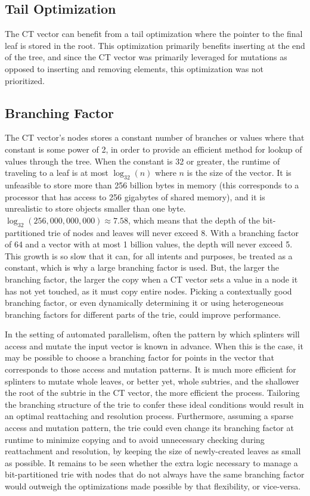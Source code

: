 \subsection{Tail Optimization}
The CT vector can benefit from a tail optimization where the pointer to
the final leaf is stored in the root. This optimization primarily benefits
inserting at the end of the tree, and since the CT vector was primarily
leveraged for mutations as opposed to inserting and removing elements, this
optimization was not prioritized.

\subsection{Branching Factor}
The CT vector's nodes stores a constant number of branches or values where that
constant is some power of 2, in order to provide an efficient method for lookup
of values through the tree. When the constant is 32 or greater, the runtime of
traveling to a leaf is at most $\log_{32}(n)$ where $n$ is the size of the
vector. It is unfeasible to store more than 256 billion bytes in memory (this
corresponds to a processor that has access to 256 gigabytes of shared memory),
and it is unrealistic to store objects smaller than one byte.
$\log_{32}(256,000,000,000) \approx 7.58$, which means that the depth of the
bit-partitioned trie of nodes and leaves will never exceed 8. With a branching
factor of 64 and a vector with at most 1 billion values, the depth will never
exceed 5. This growth is so slow that it can, for all intents and purposes, be
treated as a constant, which is why a large branching factor is used. But, the
larger the branching factor, the larger the copy when a CT vector sets a value
in a node it has not yet touched, as it must copy entire nodes. Picking a
contextually good branching factor, or even dynamically determining it or using
heterogeneous branching factors for different parts of the trie, could improve
performance.

In the setting of automated parallelism, often the pattern by which splinters
will access and mutate the input vector is known in advance. When this is the
case, it may be possible to choose a branching factor for points in the vector
that corresponds to those access and mutation patterns. It is much more
efficient for splinters to mutate whole leaves, or better yet, whole subtries,
and the shallower the root of the subtrie in the CT vector, the more efficient
the process. Tailoring the branching structure of the trie to confer these ideal
conditions would result in an optimal reattaching and resolution process.
Furthermore, assuming a sparse access and mutation pattern, the trie could even
change its branching factor at runtime to minimize copying and to avoid
unnecessary checking during reattachment and resolution, by keeping the size of
newly-created leaves as small as possible. It remains to be seen whether the extra
logic necessary to manage a bit-partitioned trie with nodes that do not always
have the same branching factor would outweigh the optimizations made possible by
that flexibility, or vice-versa.

